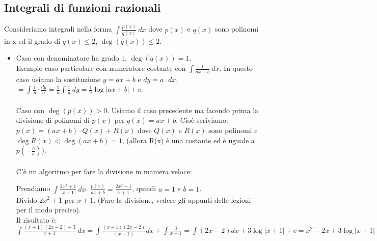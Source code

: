 \subsection{Integrali di funzioni razionali}
Consideriamo integrali nella forma $\int \frac{p(x)}{q(x)} \:dx$ dove $p(x)$ e $q(x)$ sono polinomi in x ed il grado di $q(x) \leq 2$, $\deg(q(x)) \leq 2$.
\begin{itemize}
    \item Caso con denominatore ha grado 1, $\deg(q(x)) = 1$.\\
    Esempio caso particolare con numeratore costante con $\int \frac{1}{ax + b}\:dx$. In questo caso usiamo la sostituzione $y = ax+b$ e $dy = a \cdot dx$.\\
    $= \int \frac{1}{y} \cdot \frac{dy}{a} = \frac{1}{a} \int \frac{1}{y}\:dy = \frac{1}{a} \log|ax+b| + c$.\\\\
    Caso con $\deg(p(x)) > 0$. Usiamo il caso precedente ma facendo prima la divisione di polinomi di $p(x)$ per $q(x) = ax + b$. Cioè scriviamo:\\
    $p(x) = (ax + b) \cdot Q(x) + R(x)$ dove $Q(x)$ e $R(x)$ sono polinomi e $\deg R(x) < \deg(ax + b) = 1$, (allora R(x) è una costante ed è uguale a $p(-\frac{b}{a})$).\\\\
    C'è un algoritmo per fare la divisione in maniera veloce:
    \begin{example}
    Prendiamo $\int \frac{2x^2 + 1}{x+1}\:dx$. $\frac{p(x)}{ax + b} = \frac{2x^2 +1}{x+1}$, quindi $a=1$ e $b=1$.\\
    Divido $2x^2 + 1$ per $x+1$. (Fare la divisione, vedere gli appunti delle lezioni per il modo preciso).\\
    Il risultato è: $\int \frac{(x+1)(2x-2)+3}{x+1}\:dx = \int \frac{(x+1)(2x-2)}{(x+1)}dx + \int \frac{3}{x+1} = \int (2x-2)dx + 3\log|x+1| + c = x^2 -2x + 3\log|x+1| + c$
    \end{example}
    

\end{itemize}
